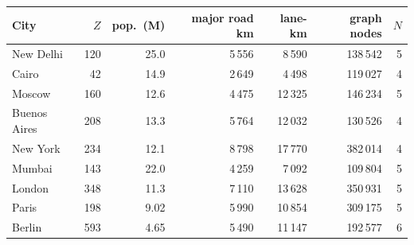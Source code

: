 \begin{tabular}{lrrrrrr}
\toprule
City & $Z$ & pop.\ (M) & major road km & lane-km & graph nodes & $N$ \\
\midrule
New Delhi & 120 & 25.0 & 5\,556 & 8\,590 & 138\,542 & 5 \\
Cairo & 42 & 14.9 & 2\,649 & 4\,498 & 119\,027 & 4 \\
Moscow & 160 & 12.6 & 4\,475 & 12\,325 & 146\,234 & 5 \\
Buenos Aires & 208 & 13.3 & 5\,764 & 12\,032 & 130\,526 & 4 \\
New York & 234 & 12.1 & 8\,798 & 17\,770 & 382\,014 & 4 \\
Mumbai & 143 & 22.0 & 4\,259 & 7\,092 & 109\,804 & 5 \\
London & 348 & 11.3 & 7\,110 & 13\,628 & 350\,931 & 5 \\
Paris & 198 & 9.02 & 5\,990 & 10\,854 & 309\,175 & 5 \\
Berlin & 593 & 4.65 & 5\,490 & 11\,147 & 192\,577 & 6 \\
\bottomrule
\end{tabular}
